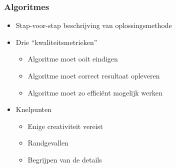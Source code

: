 \documentclass{../khlslides}
\begin{document}
\begin{frame}
  \frametitle{Algoritmes}
  \begin{itemize}
    \item Stap-voor-stap beschrijving van oplossingsmethode
          \vskip5mm
    \item Drie ``kwaliteitsmetrieken''
          \begin{itemize}
            \item Algoritme moet ooit eindigen
            \item Algoritme moet correct resultaat opleveren
            \item Algoritme moet zo effici\"ent mogelijk werken
          \end{itemize}
          \vskip5mm
    \item Knelpunten
          \begin{itemize}
            \item Enige creativiteit vereist
            \item Randgevallen
            \item Begrijpen van de details
          \end{itemize}
  \end{itemize}
\end{frame}
\end{document}
